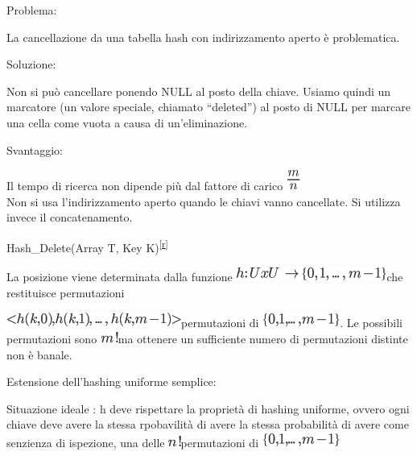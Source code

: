 \documentclass{article}
\begin{document}
{}

{Problema:}

{La cancellazione da una tabella hash con indirizzamento aperto è
problematica. }

{}

{Soluzione:}

{Non si può cancellare ponendo NULL al posto della chiave. Usiamo quindi
un marcatore (un valore speciale, chiamato ``deleted'') al posto di NULL
per marcare una cella come vuota a causa di un'eliminazione.}

{}

{Svantaggio:}

{Il tempo di ricerca non dipende più dal fattore di carico
}\includegraphics{images/image276.png}{\\
}{Non si usa l'indirizzamento aperto quando le chiavi vanno cancellate.
Si utilizza invece il concatenamento.}

{}

{Hash\_Delete(Array T, Key
K)}\textsuperscript{\protect\hyperlink{cmnt18}{{[}r{]}}}

{}

{}

{}

{La posizione viene determinata dalla funzione
}\includegraphics{images/image277.png}{che restituisce permutazioni}

\includegraphics{images/image278.png}{permutazioni di
}\includegraphics{images/image279.png}{. Le possibili permutazioni sono
}\includegraphics{images/image280.png}{ma ottenere un sufficiente numero
di permutazioni distinte non è banale.}

{}

{Estensione dell'hashing uniforme semplice: }

{Situazione ideale : }{h }{deve rispettare la proprietà di }{hashing
uniforme}{, ovvero ogni chiave deve avere la stessa rpobavilità di avere
la stessa probabilità di avere come senzienza di ispezione, una
delle}\includegraphics{images/image281.png}{permutazioni di
}\includegraphics{images/image279.png}
\end{document}
